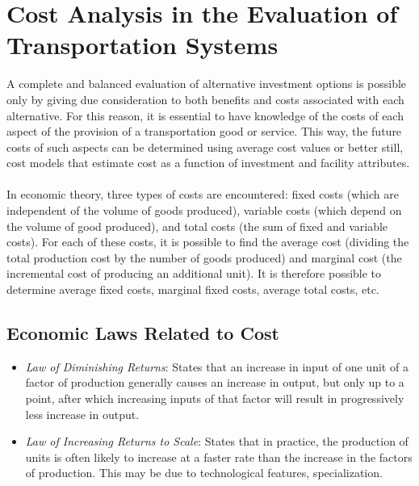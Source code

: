 \section{Cost Analysis in the Evaluation of Transportation Systems}
A complete and balanced evaluation of alternative investment options is possible only by giving due consideration to both benefits and costs associated with each alternative. For this reason, it is essential to have knowledge of the costs of each aspect of the provision of a transportation good or service. This way, the future costs of such aspects can be determined using average cost values or better still, cost models that estimate cost as a function of investment and facility attributes.
\paragraph{}
In economic theory, three types of costs are encountered: fixed costs (which are independent of the volume of goods produced), variable costs (which depend on the volume of good produced), and total costs (the sum of fixed and variable costs). For each of these costs, it is possible to find the average cost (dividing the total production cost by the number of goods produced) and marginal cost (the incremental cost of producing an additional unit). It is therefore possible to determine average fixed costs, marginal fixed costs, average total costs, etc.
\subsection{Economic Laws Related to Cost}
\begin{itemize}
	\item \textit{Law of Diminishing Returns}: States that an increase in input of one unit of a factor of production generally causes an increase in output, but only up to a point, after which increasing inputs of that factor will result in progressively less increase in output.
	\item \textit{Law of Increasing Returns to Scale}: States that in practice, the production of units is often likely to increase at a faster rate than the increase in the factors of production. This may be due to technological features, specialization.
\end{itemize}
